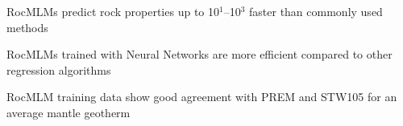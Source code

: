 \documentclass[draft,linenumbers]{agujournal2018}
\begin{document}




\begin{keypoints}
\item RocMLMs predict rock properties up to 10\(^1\)--10\(^3\) faster than commonly used methods
\item RocMLMs trained with Neural Networks are more efficient compared to other regression algorithms
\item RocMLM training data show good agreement with PREM and STW105 for an average mantle geotherm
\end{keypoints}

%
%

\end{document}
